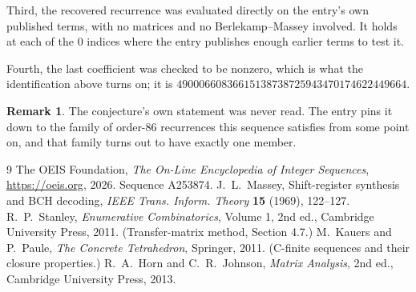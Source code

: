 \documentclass[11pt,a4paper]{article}
\theoremstyle{plain}
\theoremstyle{definition}
\newtheorem{remark}[theorem]{Remark}
\begin{document}
Third, the recovered recurrence was evaluated directly on the entry's own published terms, with
no matrices and no Berlekamp--Massey involved. It holds at each of the $0$ indices where
the entry publishes enough earlier terms to test it.

Fourth, the last coefficient was checked to be nonzero, which is what the identification above
turns on; it is $49000660836615138738725943470174622449664$.

\begin{remark}
The conjecture's own statement was never read. The entry pins it down to the family of
order-$86$ recurrences this sequence satisfies from some point on, and that family turns
out to have exactly one member.
\end{remark}

\begin{thebibliography}{9}
 The OEIS Foundation, \emph{The On-Line Encyclopedia of Integer
Sequences}, \url{https://oeis.org}, 2026. Sequence A253874.
 J.~L.~Massey, Shift-register synthesis and BCH decoding, \emph{IEEE
Trans. Inform. Theory} \textbf{15} (1969), 122--127.
 R.~P.~Stanley, \emph{Enumerative Combinatorics}, Volume 1, 2nd ed.,
Cambridge University Press, 2011. (Transfer-matrix method, Section 4.7.)
 M.~Kauers and P.~Paule, \emph{The Concrete Tetrahedron}, Springer, 2011.
(C-finite sequences and their closure properties.)
 R.~A.~Horn and C.~R.~Johnson, \emph{Matrix Analysis}, 2nd ed., Cambridge
University Press, 2013.
\end{thebibliography}
\end{document}

